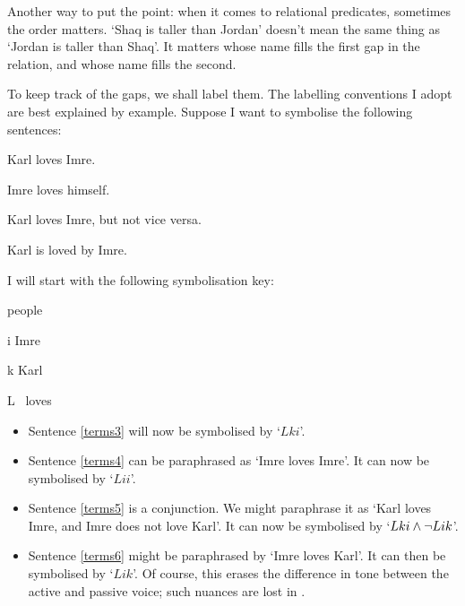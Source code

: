 Another way to put the point: when it comes to relational predicates, sometimes the order matters. `Shaq is taller than Jordan' doesn't mean the same thing as `Jordan is taller than Shaq'. It matters whose name fills the first gap in the relation, and whose name fills the second. 

To keep track of the gaps, we shall label them. The labelling conventions I  adopt are best explained by example. Suppose I want to symbolise the following sentences:
	\begin{earg}
		\item[\ex{terms3}] Karl loves Imre.
		\item[\ex{terms4}] Imre loves himself.
		\item[\ex{terms5}] Karl loves Imre, but not vice versa.
		\item[\ex{terms6}] Karl is loved by Imre.
	\end{earg}
I will start with the following symbolisation key:
	\begin{ekey}
		\item[\text{domain}] people
		\item[i] Imre
		\item[k] Karl
		\item[L] \ loves 
	\end{ekey}
\begin{itemize}
	\item Sentence \ref{terms3} will now be symbolised by `$Lki$'. 
	\item Sentence \ref{terms4} can be paraphrased as `Imre loves Imre'. It can now be symbolised by `$Lii$'. 
\item Sentence \ref{terms5} is a conjunction. We might paraphrase it as `Karl loves Imre, and Imre does not love Karl'. It can now be symbolised by `$Lki \wedge \neg Lik$'. 
\item Sentence \ref{terms6} might be paraphrased by `Imre loves Karl'. It can then be symbolised by `$Lik$'. Of course, this erases the difference in tone between the active and passive voice; such nuances are lost in \FOL. 
\end{itemize}
